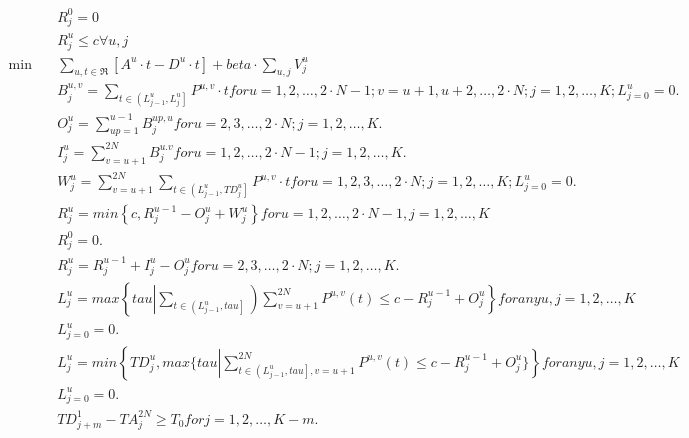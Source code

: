 \begin{align}
  & R_{j}^{0} = 0 \tag{eq\_0021\_b} \\
  & R_{j}^{u} \leq c \forall u , j \tag{eq\_0022} \\
  \min\quad & \sum_{u, t \in \mathfrak{R}} \left[A^{u} \cdot t - D^{u} \cdot t\right] + \mathit{beta} \cdot \sum_{u, j} V_{j}^{u} \tag{eq\_0023} \\
  & B_{j}^{u , v} = \sum_{t \in \left(L_{j - 1}^{u} , L_{j}^{u}\right]} P^{u , v} \cdot t for u = 1 , 2 , \ldots , 2 \cdot N - 1 ; v = u + 1 , u + 2 , \ldots , 2 \cdot N ; j = 1 , 2 , \ldots , K ; L_{j = 0}^{u} = 0 . \tag{eq\_0024} \\
  & O_{j}^{u} = \sum_{up = 1}^{u - 1} B_{j}^{up , u} for u = 2 , 3 , \ldots , 2 \cdot N ; j = 1 , 2 , \ldots , K . \tag{eq\_0025} \\
  & I_{j}^{u} = \sum_{v = u + 1}^{2 N} B_{j}^{u . v} for u = 1 , 2 , \ldots , 2 \cdot N - 1 ; j = 1 , 2 , \ldots , K . \tag{eq\_0026} \\
  & W_{j}^{u} = \sum_{v = u + 1}^{2 N} \sum_{t \in \left(L_{j - 1}^{u} , \mathit{TD}_{j}^{u}\right]} P^{u , v} \cdot t for u = 1 , 2 , 3 , \ldots , 2 \cdot N ; j = 1 , 2 , \ldots , K ; L_{j = 0}^{u} = 0 . \tag{eq\_0027} \\
  & R_{j}^{u} = min \left\{c , R_{j}^{u - 1} - O_{j}^{u} + W_{j}^{u}\right\} for u = 1 , 2 , \ldots , 2 \cdot N - 1 , j = 1 , 2 , \ldots , K \tag{eq\_0028\_a} \\
  & R_{j}^{0} = 0 . \tag{eq\_0028\_b} \\
  & R_{j}^{u} = R_{j}^{u - 1} + I_{j}^{u} - O_{j}^{u} for u = 2 , 3 , \ldots , 2 \cdot N ; j = 1 , 2 , \ldots , K . \tag{eq\_0029} \\
  & L_{j}^{u} = max \left\{\mathit{tau} \left|\sum_{t \in \left(L_{j - 1}^{u} , \mathit{tau}\right]}\right) \sum_{v = u + 1}^{2 N} P^{u , v} \left(t\right) \leq c - R_{j}^{u - 1} + O_{j}^{u}\right\} for any u , j = 1 , 2 , \ldots , K \tag{eq\_0030\_a} \\
  & L_{j = 0}^{u} = 0 . \tag{eq\_0030\_b} \\
  & L_{j}^{u} = min \left\{\mathit{TD}_{j}^{u} , max \{ \mathit{tau} \left|\right. \sum_{t \in \left(L_{j - 1}^{u} , \mathit{tau}\right], v = u + 1} ^{2 N} P^{u , v} \left(t\right) \leq c - R_{j}^{u - 1} + O_{j}^{u} \} \right\} for any u , j = 1 , 2 , \ldots , K \tag{eq\_0031\_a} \\
  & L_{j = 0}^{u} = 0 . \tag{eq\_0031\_b} \\
  & \mathit{TD}_{j + m}^{1} - \mathit{TA}_{j}^{2 N} \geq T_{0} for j = 1 , 2 , \ldots , K - m . \tag{eq\_0032} \\

\end{align}
